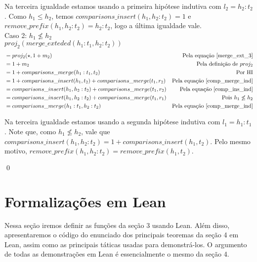 \documentclass[12pt, oneside, a4paper,english,brazil]{abntex2}
\begin{document}
Na terceira igualdade estamos usando a primeira hip\'otese indutiva com $l_{2} = h_{2} : t_{2}$. Como $h_{1} \le h_{2}$, temos $comparisons\_insert(h_{1}, h_{2} : t_{2}) = 1$ e $remove\_prefix(h_{1}, h_{2} : t_{2}) = h_{2} : t_{2}$, logo a \'ultima
igualdade vale. \\


Caso 2: $h_{1} \not \le h_{2}$\\

$proj_{2}(merge\_exteded(h_{1} : t_{1}, h_{2} : t_{2}))$
\begin{align*}
  &= proj_{2}(\star, 1 + m_{2}) &\text{Pela equa\c{c}\~ao \ref{merge_ext_3}}\\
  &= 1 + m_{2} &\text{Pela defini\c{c}\~ao de $proj_{2}$}\\
  &= 1 + comparisons\_merge(h_{1} : t_{1}, t_{2}) &\text{Por HI} \\
  &= 1 + comparisons\_insert(h_{1}, t_{2}) + comparisons\_merge(t_{1}, r_{2}) &\text{Pela equa\c{c}\~ao \ref{comp_merge_ind}}\\
  &= comparisons\_insert(h_{1}, h_{2} : t_{2}) + comparisons\_merge(t_{1}, r_{2}) &\text{Pela equa\c{c}\~ao \ref{comp_ins_ind}}\\
  &= comparisons\_insert(h_{1}, h_{2} : t_{2}) + comparisons\_merge(t_{1}, r_{1}) &\text{Pois $h_{1} \not \le h_{2}$}\\
  &= comparisons\_merge(h_{1} : t_{1}, h_{2} : t_{2}) &\text{Pela equa\c{c}\~ao \ref{comp_merge_ind}}
\end{align*}

Na terceira igualdade estamos usando a segunda hip\'otese indutiva com $l_{1} = h_{1} : t_{1}$. Note que,
como $h_{1} \not \le h_{2}$, vale que $comparisons\_insert(h_{1}, h_{2} : t_{2}) = 1 + comparisons\_insert(h_{1}, t_{2})$. Pelo mesmo motivo, $remove\_prefix(h_{1}, h_{2} : t_{2}) = remove\_prefix(h_{1}, t_{2})$.

\qed


\chapter{Formaliza\c{c}\~oes em Lean}

Nessa se\c{c}\~ao iremos definir as fun\c{c}\~oes da se\c{c}\~ao 3 usando Lean. Al\'em disso, apresentaremos o c\'odigo do enunciado dos principais teoremas da se\c{c}\~ao 4 em Lean, assim como as principais t\'aticas usadas para demonstr\'a-los. O argumento de todas as demonstra\c{c}\~oes em Lean \'e essencialmente o mesmo da se\c{c}\~ao 4.
\end{document}
